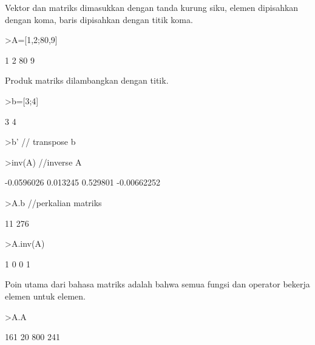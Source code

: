\documentclass[a4paper,10pt]{article}
\begin{document}
\begin{eulernotebook}
\begin{eulercomment}
\begin{eulercomment}
\begin{eulercomment}
\begin{eulercomment}
\begin{eulercomment}
\begin{eulercomment}
\begin{eulercomment}
Vektor dan matriks dimasukkan dengan tanda kurung siku, elemen
dipisahkan dengan koma, baris dipisahkan dengan titik koma.
\end{eulercomment}
\begin{eulerprompt}
>A=[1,2;80,9]
\end{eulerprompt}
\begin{euleroutput}
              1             2 
             80             9 
\end{euleroutput}
\begin{eulercomment}
Produk matriks dilambangkan dengan titik.
\end{eulercomment}
\begin{eulerprompt}
>b=[3;4]
\end{eulerprompt}
\begin{euleroutput}
              3 
              4 
\end{euleroutput}
\begin{eulerprompt}
>b' // transpose b
\end{eulerprompt}
\begin{euleroutput}
  [3,  4]
\end{euleroutput}
\begin{eulerprompt}
>inv(A) //inverse A
\end{eulerprompt}
\begin{euleroutput}
     -0.0596026      0.013245 
       0.529801   -0.00662252 
\end{euleroutput}
\begin{eulerprompt}
>A.b //perkalian matriks
\end{eulerprompt}
\begin{euleroutput}
             11 
            276 
\end{euleroutput}
\begin{eulerprompt}
>A.inv(A)
\end{eulerprompt}
\begin{euleroutput}
              1             0 
              0             1 
\end{euleroutput}
\begin{eulercomment}
Poin utama dari bahasa matriks adalah bahwa semua fungsi dan operator
bekerja elemen untuk elemen.
\end{eulercomment}
\begin{eulerprompt}
>A.A
\end{eulerprompt}
\begin{euleroutput}
            161            20 
            800           241 
\end{euleroutput}

\end{eulercomment}
\end{eulercomment}
\end{eulercomment}
\end{eulercomment}
\end{eulercomment}
\end{eulercomment}
\end{eulernotebook}
\end{document}
